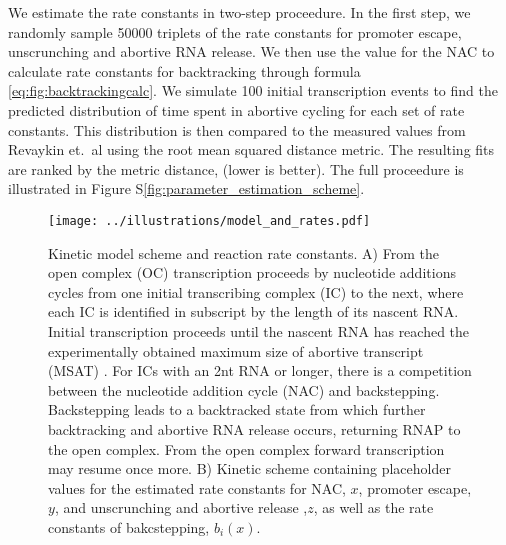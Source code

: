We estimate the rate constants in two-step proceedure. In the first step, we
randomly sample 50000 triplets of the rate constants for promoter escape,
unscrunching and abortive RNA release. We then use the value for the NAC to
calculate rate constants for backtracking through formula
\eqref{eq:fig:backtrackingcalc}. We simulate
100 initial transcription events to find the predicted distribution of time
spent in abortive cycling for each set of rate constants. This distribution is
then compared to the measured values from Revaykin et.\ al
\cite{revyakin_abortive_2006} using the root mean squared distance metric. The
resulting fits are ranked by the metric distance, (lower is better). The
full proceedure is illustrated in Figure S\ref{fig:parameter_estimation_scheme}.

\begin{figure}
	\begin{center}
        \texttt{[image: ../illustrations/model\_and\_rates.pdf]}
	\end{center}
    \caption{Kinetic model scheme and reaction rate constants. A) From the
    open complex (OC) transcription proceeds by nucleotide additions cycles
    from one initial transcribing complex (IC) to the next, where each IC is
    identified in subscript by the length of its nascent RNA. Initial
    transcription proceeds until the nascent RNA has reached the
    experimentally obtained maximum size of abortive transcript (MSAT)
    \cite{hsu_initial_2006}. For ICs with an 2nt RNA or longer, there is a
    competition between the nucleotide addition cycle (NAC) and backstepping.
    Backstepping leads to a backtracked state from which further backtracking
    and abortive RNA release occurs, returning RNAP to the open complex. From
    the open complex forward transcription may resume once more. B) Kinetic
    scheme containing placeholder values for the estimated rate constants for
    NAC, $x$, promoter escape, $y$, and unscrunching and abortive release ,$z$,
    as well as the rate constants of bakcstepping, $b_i(x)$.}
    \label{fig:model_and_rates}
\end{figure}

